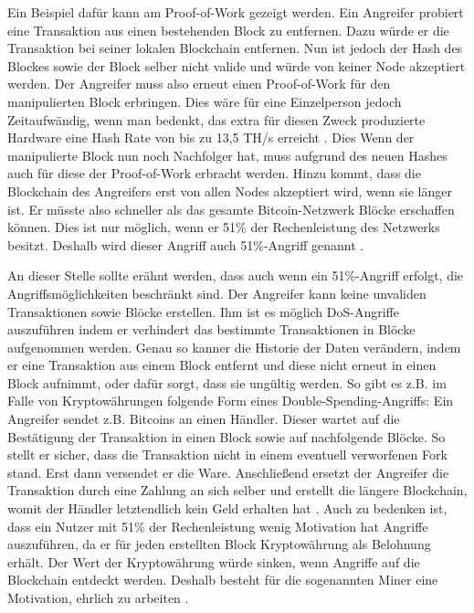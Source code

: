 Ein Beispiel dafür kann am Proof-of-Work gezeigt werden. Ein Angreifer probiert eine Transaktion aus einen bestehenden Block zu entfernen. Dazu würde er die Transaktion bei seiner lokalen Blockchain entfernen. Nun ist jedoch der Hash des Blockes sowie der Block selber nicht valide und würde von keiner Node akzeptiert werden. Der Angreifer muss also erneut einen Proof-of-Work für den manipulierten Block erbringen. Dies wäre für eine Einzelperson jedoch Zeitaufwändig, wenn man bedenkt, das extra für diesen Zweck produzierte Hardware eine Hash Rate von bis zu 13,5 TH/s erreicht \cite{Mining?LearnBitcoinmining}. Dies  Wenn der manipulierte Block nun noch Nachfolger hat, muss aufgrund des neuen Hashes auch für diese der Proof-of-Work erbracht werden. Hinzu kommt, dass die Blockchain des Angreifers erst von allen Nodes akzeptiert wird, wenn sie länger ist. Er müsste also schneller als das gesamte Bitcoin-Netzwerk Blöcke erschaffen können.  Dies ist nur möglich, wenn er 51\% der Rechenleistung des Netzwerks besitzt. Deshalb wird dieser Angriff auch 51\%-Angriff genannt \cite{SwanBlockchainblueprintnew2015} \cite{EthereumWhitepaper2017}.

An dieser Stelle sollte erähnt werden, dass auch wenn ein 51\%-Angriff erfolgt, die Angriffsmöglichkeiten beschränkt sind. Der Angreifer kann keine unvaliden Transaktionen sowie Blöcke erstellen. Ihm ist es möglich DoS-Angriffe auszuführen indem er verhindert das bestimmte Transaktionen in Blöcke aufgenommen werden. Genau so kanner die Historie der Daten verändern, indem er eine Transaktion aus einem Block entfernt und diese nicht erneut in einen Block aufnimmt, oder dafür sorgt, dass sie ungültig werden. So gibt es z.B. im Falle von Kryptowährungen folgende Form eines Double-Spending-Angriffs: Ein Angreifer sendet z.B. Bitcoins an einen Händler. Dieser wartet auf die Bestätigung der Transaktion in einen Block sowie auf nachfolgende Blöcke. So stellt er sicher, dass die Transaktion nicht in einem eventuell verworfenen Fork stand. Erst dann versendet er die Ware. Anschließend ersetzt der Angreifer die Transaktion durch eine Zahlung an sich selber und erstellt die längere Blockchain, womit der Händler letztendlich kein Geld erhalten hat \cite{EthereumWhitepaper2017}. Auch zu bedenken ist, dass ein Nutzer mit 51\% der Rechenleistung wenig Motivation hat Angriffe auszuführen, da er für jeden erstellten Block Kryptowährung als Belohnung erhält. Der Wert der Kryptowährung würde sinken, wenn Angriffe auf die Blockchain entdeckt werden. Deshalb besteht für die sogenannten Miner eine Motivation, ehrlich zu arbeiten \cite{AntonopoulosMasteringbitcoin2015}.

